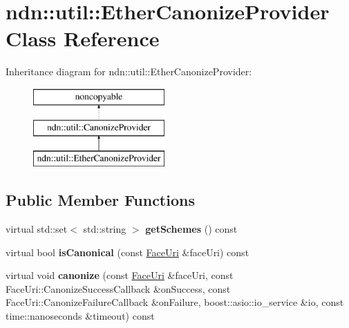 \hypertarget{classndn_1_1util_1_1EtherCanonizeProvider}{}\section{ndn\+:\+:util\+:\+:Ether\+Canonize\+Provider Class Reference}
\label{classndn_1_1util_1_1EtherCanonizeProvider}
Inheritance diagram for ndn\+:\+:util\+:\+:Ether\+Canonize\+Provider\+:\begin{figure}[H]
\begin{center}
\leavevmode
\includegraphics[height=3.000000cm]{classndn_1_1util_1_1EtherCanonizeProvider}
\end{center}
\end{figure}
\subsection*{Public Member Functions}
\begin{DoxyCompactItemize}
\item 
virtual std\+::set$<$ std\+::string $>$ {\bfseries get\+Schemes} () const\hypertarget{classndn_1_1util_1_1EtherCanonizeProvider_a8bc10216721764d6c72b13301b005a9b}{}\label{classndn_1_1util_1_1EtherCanonizeProvider_a8bc10216721764d6c72b13301b005a9b}

\item 
virtual bool {\bfseries is\+Canonical} (const \hyperlink{classndn_1_1util_1_1FaceUri}{Face\+Uri} \&face\+Uri) const\hypertarget{classndn_1_1util_1_1EtherCanonizeProvider_a7395dbea984afdf1c69dbb88419c0ca9}{}\label{classndn_1_1util_1_1EtherCanonizeProvider_a7395dbea984afdf1c69dbb88419c0ca9}

\item 
virtual void {\bfseries canonize} (const \hyperlink{classndn_1_1util_1_1FaceUri}{Face\+Uri} \&face\+Uri, const Face\+Uri\+::\+Canonize\+Success\+Callback \&on\+Success, const Face\+Uri\+::\+Canonize\+Failure\+Callback \&on\+Failure, boost\+::asio\+::io\+\_\+service \&io, const time\+::nanoseconds \&timeout) const\hypertarget{classndn_1_1util_1_1EtherCanonizeProvider_acfff38eaabacce7abbed10f00b80a8c5}{}\label{classndn_1_1util_1_1EtherCanonizeProvider_acfff38eaabacce7abbed10f00b80a8c5}

\end{DoxyCompactItemize}


